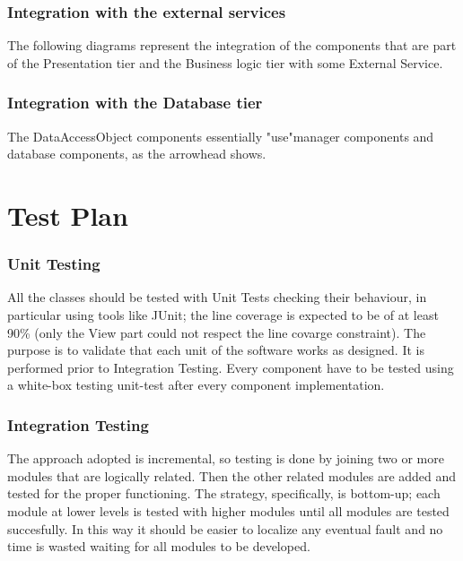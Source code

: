 \documentclass[../DD.tex]{subfiles}
\begin{document}
\subsubsection{Integration with the external services}
The following diagrams represent the integration of the components that are part of the Presentation tier and the Business logic tier with some External Service.


\subsubsection{Integration with the Database tier}
The DataAccessObject components essentially "use"manager components and database components, as the arrowhead shows.


\section{Test Plan\label{5.4}}

\subsubsection{Unit Testing\label{5.4.1}}
All the classes should be tested with Unit Tests checking their behaviour, in particular using tools like JUnit; the line coverage is expected to be of at least 90\% (only the View part could not respect the line covarge constraint). The purpose is to validate that each unit of the software works as designed. It is performed prior to Integration Testing. Every component have to be tested using a white-box testing unit-test after every component implementation.


\subsubsection{Integration Testing\label{5.4.2}}

The approach adopted is incremental, so testing is done by joining two or more modules that are logically related. Then the other related modules are added and tested for the proper functioning. The strategy, specifically, is bottom-up; each module at lower levels is tested with higher modules until all modules are tested succesfully. In this way it should be easier to localize any eventual fault and no time is wasted waiting for all modules to be developed.
\end{document}
